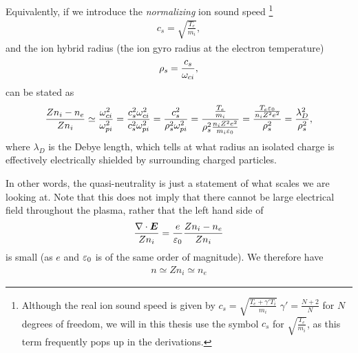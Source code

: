 Equivalently, if we introduce the \emph{normalizing} ion sound speed%
%
\footnote{Although the real ion sound speed is given by $c_s=\sqrt{\frac{T_e+\gamma' T_i}{m_i}}\;\gamma'=\frac{N+2}{N}$ for $N$ degrees of freedom, we will in this thesis use the symbol $c_s$ for $\sqrt{\frac{T_e}{m_i}}$, as this term frequently pops up in the derivations.}
%
\begin{align*}
    c_s = \sqrt{\frac{T_e}{m_i}},
\end  {align*}
%
and the ion hybrid radius (the ion gyro radius at the electron temperature)
%
\begin{align*}
   \rho_s=\frac{c_s}{\omega_{ci}},
\end  {align*}
%
 can be stated as
%
\begin{align*}
    \frac{Zn_i - n_e}{Zn_i}
    \simeq
    \frac{\omega_{ci}^2}{\omega_{pi}^2}
    =
    \frac{c_s^2\omega_{ci}^2}{c_s^2\omega_{pi}^2}
    =
    \frac{c_s^2}{\rho_s^2\omega_{pi}^2}
    =
    \frac{\frac{T_e}{m_i}}{\rho_s^2\frac{n_iZ^2e^2}{m_i\varepsilon_0}}
    =
    \frac{\frac{T_e\varepsilon_0}{n_iZ^2e^2}}{\rho_s^2}
    =
    \frac{\lambda_D^2}{\rho_s^2},
\end{align*}
%
where $\lambda_D$ is the Debye length, which tells at what radius an isolated charge is effectively electrically shielded by surrounding charged particles.

In other words, the quasi-neutrality is just a statement of what scales we are looking at.
Note that this does not imply that there cannot be large electrical field throughout the plasma, rather that the left hand side of
%
\begin{align*}
    \frac{\nabla\cdot \boldsymbol{E}}{Zn_i} = \frac{e}{\varepsilon_0} \frac{Zn_i-n_e}{Zn_i}
\end{align*}
%
is small (as $e$ and $\varepsilon_0$ is of the same order of magnitude).
We therefore have
%
\begin{align*}
    n\simeq Zn_i \simeq n_e
\end{align*}

